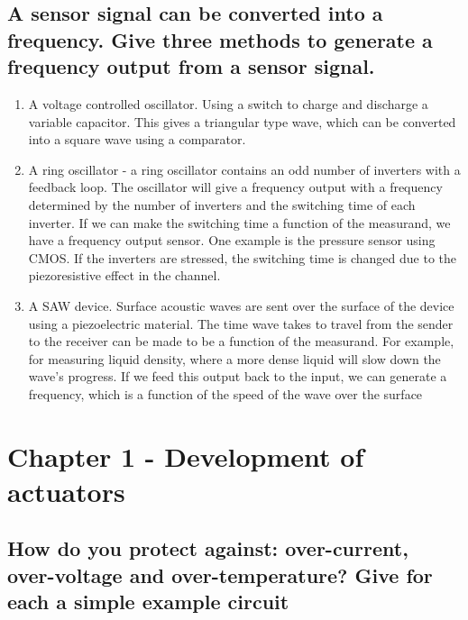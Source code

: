 \documentclass[10pt,a4paper]{article}
\begin{document}
\subsection{A sensor signal can be converted into a frequency. Give three methods to generate a frequency output from a
sensor signal.}

\begin{enumerate}

	\item A voltage controlled oscillator. Using a switch to charge and discharge a variable capacitor. This gives a triangular type wave, which can be converted into a square wave using a comparator.
	\item A ring oscillator - a ring oscillator contains an odd number of inverters with a feedback loop. The oscillator will give a frequency output with a frequency determined by the number of inverters and the switching time of each inverter. If we can make the switching time a function of the measurand, we have a frequency output sensor. One example is the pressure sensor using CMOS. If the inverters are stressed, the switching time is changed due to the piezoresistive effect in the channel.
	\item A SAW device. Surface acoustic waves are sent over the surface of the device using a piezoelectric material. The time wave takes to travel from the sender to the receiver can be made to be a function of the measurand. For example, for measuring liquid density, where a more dense liquid will slow down the wave's progress. If we feed this output back to the input, we can generate a frequency, which is a function of the speed of the wave over the surface
\end{enumerate}

\section{Chapter 1 - Development of actuators}

\subsection{How do you protect against: over-current, over-voltage and over-temperature? Give for each a simple example circuit}
\end{document}
